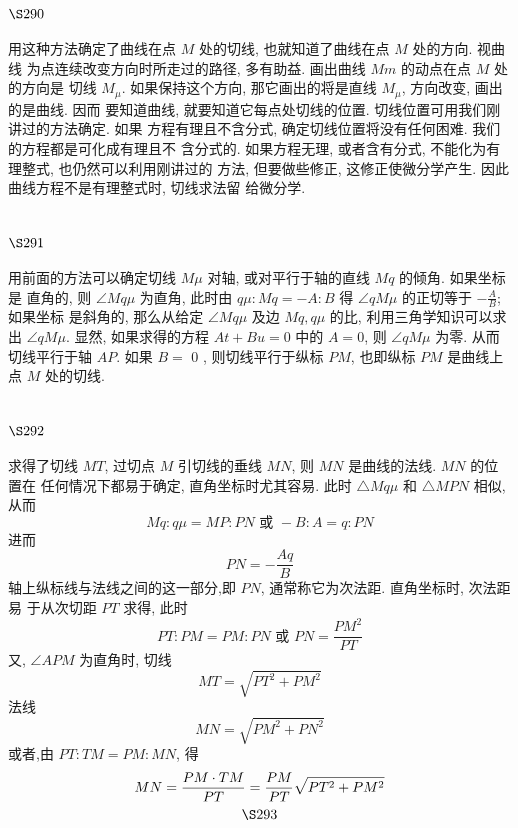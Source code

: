 \section{$\S 290$}

用这种方法确定了曲线在点 $M$ 处的切线, 也就知道了曲线在点 $M$ 处的方向. 视曲线 为点连续改变方向时所走过的路径, 多有助益. 画出曲线 $M m$ 的动点在点 $M$ 处的方向是 切线 $M_{\mu}$. 如果保持这个方向, 那它画出的将是直线 $M_{\mu}$, 方向改变, 画出的是曲线. 因而 要知道曲线, 就要知道它每点处切线的位置. 切线位置可用我们刚讲过的方法确定. 如果 方程有理且不含分式, 确定切线位置将没有任何困难. 我们的方程都是可化成有理且不 含分式的. 如果方程无理, 或者含有分式, 不能化为有理整式, 也仍然可以利用刚讲过的 方法, 但要做些修正, 这修正使微分学产生. 因此曲线方程不是有理整式时, 切线求法留 给微分学.

\section{$\S 291$}

用前面的方法可以确定切线 $M \mu$ 对轴, 或对平行于轴的直线 $M q$ 的倾角. 如果坐标是 直角的, 则 $\angle M q \mu$ 为直角, 此时由 $q \mu: M q=-A: B$ 得 $\angle q M \mu$ 的正切等于 $-\frac{A}{B}$; 如果坐标 是斜角的, 那么从给定 $\angle M q \mu$ 及边 $M q, q \mu$ 的比, 利用三角学知识可以求出 $\angle q M \mu$. 显然, 如果求得的方程 $A t+B u=0$ 中的 $A=0$, 则 $\angle q M \mu$ 为零. 从而切线平行于轴 $A P$. 如果 $B=$ 0 , 则切线平行于纵标 $P M$, 也即纵标 $P M$ 是曲线上点 $M$ 处的切线.

\section{$\S 292$}

求得了切线 $M T$, 过切点 $M$ 引切线的垂线 $M N$, 则 $M N$ 是曲线的法线. $M N$ 的位置在 任何情况下都易于确定, 直角坐标时尤其容易. 此时 $\triangle M q \mu$ 和 $\triangle M P N$ 相似, 从而
\[
M q: q \mu=M P: P N \text { 或 }-B: A=q: P N
\]
进而
\[
P N=-\frac{A q}{B}
\]
轴上纵标线与法线之间的这一部分,即 $P N$, 通常称它为次法距. 直角坐标时, 次法距易 于从次切距 $P T$ 求得, 此时
\[
P T: P M=P M: P N \text { 或 } P N=\frac{P M^{2}}{P T}
\]
又, $\angle A P M$ 为直角时, 切线
\[
M T=\sqrt{P T^{2}+P M^{2}}
\]
法线
\[
M N=\sqrt{P M^{2}+P N^{2}}
\]
或者,由 $P T: T M=P M: M N$, 得
\[
\begin{gathered}
M N=\frac{P M \cdot T M}{P T}=\frac{P M}{P T} \sqrt{P T^{2}+P M^{2}} \\
\S 293
\end{gathered}
\]
